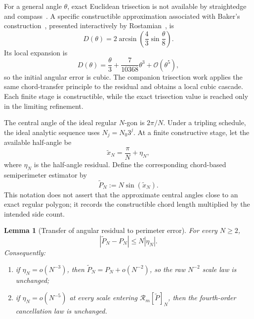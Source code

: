 \documentclass[12pt]{article}
\newtheorem{lemma}[theorem]{Lemma}
\theoremstyle{definition}
\theoremstyle{remark}
\newcommand{\Rop}{\mathcal{R}}
\newcommand{\abs}[1]{\left|#1\right|}
\newcommand{\Order}{\mathcal{O}}
\begin{document}
For a general angle $\theta$, exact Euclidean trisection is not available by
straightedge and compass~\cite{wantzel}.  A specific constructible approximation
associated with Baker's construction~\cite{baker-trisection,baker-proportional},
presented interactively by Rostamian~\cite{rostamian}, is
\begin{equation}
  D(\theta)
  =2\arcsin\!\left(\frac43\sin\frac{\theta}{8}\right).
  \label{eq:Dtheta}
\end{equation}
Its local expansion is
\begin{equation}
  D(\theta)
  =\frac{\theta}{3}
   +\frac{7}{10368}\theta^3
   +\Order(\theta^5),
  \label{eq:Dexpansion}
\end{equation}
so the initial angular error is cubic.  The companion trisection work applies
the same chord-transfer principle to the residual and obtains a local cubic
cascade.  Each finite stage is constructible, while the exact trisection value
is reached only in the limiting refinement.

The central angle of the ideal regular $N$-gon is $2\pi/N$.  Under a tripling
schedule, the ideal analytic sequence uses $N_j=N_0 3^j$.  At a finite
constructive stage, let the available half-angle be
\begin{equation}
  \widetilde x_N=\frac{\pi}{N}+\eta_N,
  \label{eq:angle-perturbation}
\end{equation}
where $\eta_N$ is the half-angle residual.  Define the corresponding chord-based
semiperimeter estimator by
\begin{equation}
  \widetilde P_N:=N\sin(\widetilde x_N).
  \label{eq:Ptilde}
\end{equation}
This notation does not assert that the approximate central angles close to an
exact regular polygon; it records the constructible chord length multiplied by
the intended side count.

\begin{lemma}[Transfer of angular residual to perimeter error]
\label{lem:transfer}
For every $N\ge2$,
\begin{equation}
  \abs{\widetilde P_N-P_N}\le N\abs{\eta_N}.
  \label{eq:perturbation-bound}
\end{equation}
Consequently:
\begin{enumerate}
  \item if $\eta_N=o(N^{-3})$, then
        $\widetilde P_N=P_N+o(N^{-2})$, so the raw $N^{-2}$ scale law is
        unchanged;
  \item if $\eta_N=o(N^{-5})$ at every scale entering
        $\Rop_m[\widetilde P]_N$, then the fourth-order cancellation law is
        unchanged.
\end{enumerate}
\end{lemma}
\end{document}
